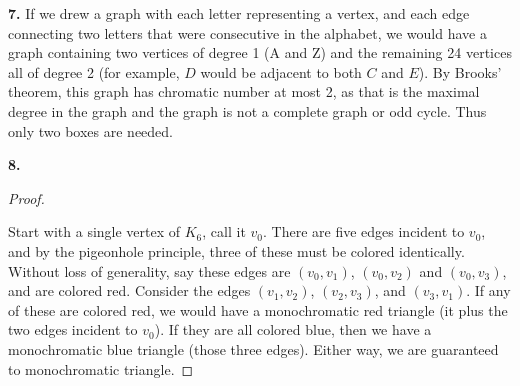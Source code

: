\documentclass[10pt,]{book}
\theoremstyle{plain}
\theoremstyle{definition}
\theoremstyle{definition}
\theoremstyle{definition}
\numberwithin{equation}{chapter}
\begin{document}
\noindent\textbf{7.}\quad{}
If we drew a graph with each letter representing a vertex, and each edge connecting two letters that were consecutive in the alphabet, we would have a graph containing two vertices of degree 1 (A and Z) and the remaining 24 vertices all of degree 2 (for example, \(D\) would be adjacent to both \(C\) and \(E\)). By Brooks' theorem, this graph has chromatic number at most 2, as that is the maximal degree in the graph and the graph is not a complete graph or odd cycle. Thus only two boxes are needed.
%
\par\smallskip
\noindent\textbf{8.}\quad{}\begin{proof}\hypertarget{proof-62}{}

Start with a single vertex of \(K_6\), call it \(v_0\). There are five edges incident to \(v_0\), and by the pigeonhole principle, three of these must be colored identically. Without loss of generality, say these edges are \((v_0, v_1)\), \((v_0, v_2)\) and \((v_0,v_3)\), and are colored red. Consider the edges \((v_1,v_2)\), \((v_2,v_3)\), and \((v_3, v_1)\). If any of these are colored red, we would have a monochromatic red triangle (it plus the two edges incident to \(v_0\)). If they are all colored blue, then we have a monochromatic blue triangle (those three edges). Either way, we are guaranteed to monochromatic triangle.
%
\end{proof}
\par\smallskip
\end{document}
